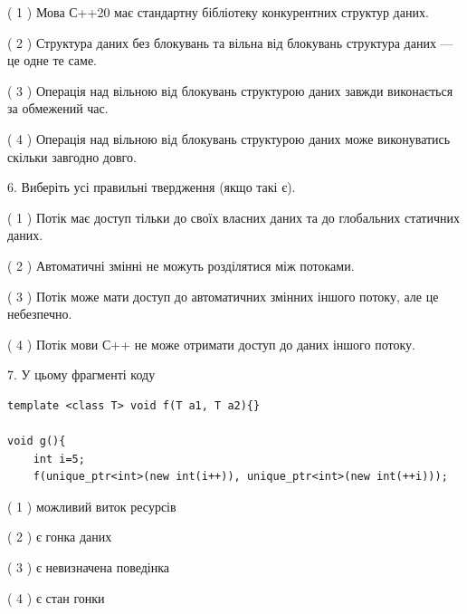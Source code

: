 \documentclass[12pt, ukrainian]{article}
\begin{document}
\begin {large}
{( 1 ) Мова С++20 має стандартну бібліотеку конкурентних структур даних.%

( 2 ) Структура даних без блокувань та вільна від блокувань структура даних --- це одне те саме.%

( 3 ) Операція над вільною від блокувань структурою даних завжди виконається за обмежений час.%

( 4 ) Операція над вільною від блокувань структурою даних може виконуватись скільки завгодно довго.%
\newpage



\vspace{5mm}
6. Виберіть усі правильні твердження (якщо такі є).\par
\vspace{2mm}

( 1 ) Потік має доступ тільки до своїх власних даних та до глобальних статичних даних.%

( 2 ) Автоматичні змінні не можуть розділятися між потоками.%

( 3 ) Потік може мати доступ до автоматичних змінних іншого потоку, але це небезпечно.%

( 4 ) Потік мови С++ не може отримати доступ до даних іншого потоку.%


\vspace{5mm}
7. У цьому фрагменті коду
\begin{verbatim}
template <class T> void f(T a1, T a2){}

void g(){
    int i=5;
    f(unique_ptr<int>(new int(i++)), unique_ptr<int>(new int(++i)));
\end{verbatim}

( 1 ) можливий виток ресурсів%

( 2 ) є гонка даних%

( 3 ) є невизначена поведінка%

( 4 ) є стан гонки%
}
\end {large}
\end{document}
